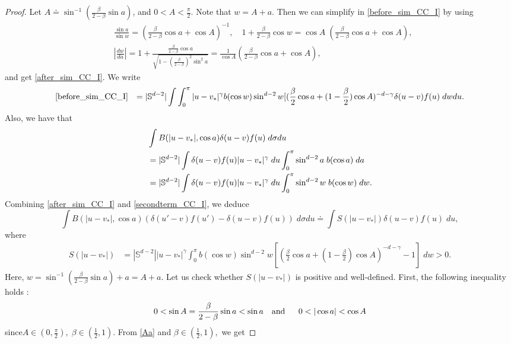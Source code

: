 \documentclass[reqno,10pt]{amsart}
\numberwithin{equation}{section}
\begin{document}
\begin{proof}
\noindent Let $A \doteq \sin^{-1}(\frac{\beta}{2-\beta}\sin a)$, and $0 < A < \frac{\pi}{2}.$ Note that $w = A+a.$ 
Then we can simplify in \eqref{before_sim_CC_I} by using 
\begin{align*}
    &\frac{\sin a}{\sin w} = (\frac{\beta}{2-\beta}\cos a + \cos A)^{-1}, \quad  1+\frac{\beta}{2-\beta}\cos w =\cos A\;(\frac{\beta}{2-\beta}\cos a + \cos A),\\ &|\frac{dw}{da}|=1+\frac{\frac{\beta}{2-\beta}\cos a}{\sqrt{1-(\frac{\beta}{2-\beta})^{2}\sin^{2}a}} =\frac{1}{\cos A}  (\frac{\beta}{2-\beta}\cos a + \cos A),
\end{align*} and get \eqref{after_sim_CC_I}. We write
\begin{align} \label{after_sim_CC_I}
     &\eqref{before_sim_CC_I} 
     &=|\mathbb{S}^{d-2}|\int \int_0^\pi |u-v_*|^{\gamma}b(\cos w)\sin^{d-2}w [(\frac{\beta}{2}\cos a + (1-\frac{\beta}{2})\cos A)^{-d-\gamma}\delta(u-v)f(u) \; dwdu. 
\end{align}
Also, we have that
\begin{align} \label{secondterm_CC_I}
	&\int B(|u-v_*|, \cos a)\delta(u-v)f(u) \; d\sigma du  \notag\\
	&= |\mathbb{S}^{d-2}|\int \delta(u-v)f(u)|u-v_*|^{\gamma}\;du \int_0^\pi \sin^{d-2}a \;b(\cos a)\;da   \notag \\
	&= |\mathbb{S}^{d-2}|\int \delta(u-v)f(u)|u-v_*|^{\gamma}\;du \int_0^\pi \sin^{d-2}w \;b(\cos w)\;dw.
\end{align}
Combining \eqref{after_sim_CC_I} and \eqref{secondterm_CC_I}, we deduce
\begin{equation*}
    \int B(|u-v_*|,\cos a)(\delta(u'-v)f(u')-\delta(u-v)f(u)) \;d\sigma du
     \doteq \int S(|u-v_*|)\delta(u-v)f(u) \;du, 
\end{equation*} where 
\begin{align} \label{S_nc_I}
    S(|u-v_*|)
    &= |\mathbb{S}^{d-2}||u-v_*|^{\gamma}\int_0^\pi b(\cos w)\sin^{d-2}w [(\frac{\beta}{2}\cos a + (1-\frac{\beta}{2})\cos A)^{-d-\gamma}-1] \; dw > 0.
\end{align}
Here, $w = \sin^{-1}(\frac{\beta}{2-\beta}\sin a)+a = A+a$. 
Let us check whether $S(|u-v_*|)$ is positive and well-defined. First, the following inequality holds :
\begin{align} \label{Aa}
     0 < \sin A = \frac{\beta}{2-\beta}\sin a < \sin a
     \text{\quad and \quad }
    \; 0 < |\cos a| < \cos A
\end{align}
since\;$A \in (0, \frac{\pi}{2}),\; \beta \in (\frac{1}{2}, 1).$ From \eqref{Aa} and $\beta \in (\frac{1}{2},1),$ we get 

\end{proof}
\end{document}
